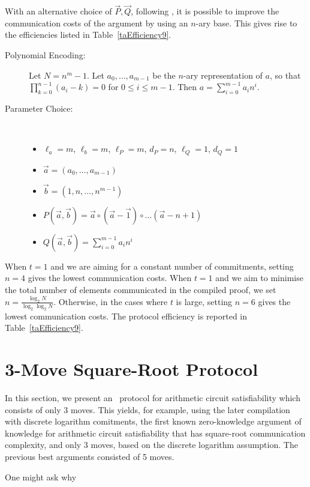 With an alternative choice of $\vec{P},\vec{Q}$, following \cite{Chaabouni2010}, it is possible to improve the communication costs of the argument by using an $n$-ary base. This gives rise to the efficiencies listed in Table~\ref{taEfficiency9}.
\begin{description}
\item[ Polynomial Encoding: ] Let $N=n^m-1$. Let $a_0,\ldots,a_{m-1}$ be the $n$-ary representation of $a$, so that $\prod_{k=0}^{n-1} (a_i - k) = 0$ for $0 \leq i \leq m-1$. Then $a = \sum_{i=0}^{m-1} a_i n^i$.
\item[ Parameter Choice: ] \ 
\begin{itemize}
\item $\ell_a=m$, $\ell_b=m$, $\ell_P=m$, $d_P=n$, $\ell_Q=1$, $d_Q=1$ 
\item $\vec{a} = (a_0,\ldots,a_{m-1})$
\item $\vec{b} = (1,n,\ldots,n^{m-1})$
\item $P(\vec{a},\vec{b}) = \vec{a} \circ ( \vec{a}-\vec{1} ) \circ \ldots ( \vec{a} - n+1 ) $
\item $Q(\vec{a},\vec{b}) = \sum_{i=0}^{m-1} a_i n^i$
\end{itemize}
\end{description}

When $t=1$ and we are aiming for a constant number of commitments, setting $n=4$ gives the lowest communication costs. When $t=1$ and we aim to minimise the total number of elements communicated in the compiled proof, we set $n = \frac{\log_2N}{\log_2 \log_2 N}$. Otherwise, in the cases where $t$ is large, setting $n=6$ gives the lowest communication costs. The protocol efficiency is reported in Table~\ref{taEfficiency9}.

\section{3-Move Square-Root Protocol} \label{subsec:3rndsqrt}

In this section, we present an \ILC\ protocol for arithmetic circuit satisfiability which consists of only 3 moves. This yields, for example, using the later compilation with discrete logarithm comitments, the first known zero-knowledge argument of knowledge for arithmetic circuit satisfiability that has square-root communication complexity, and only 3 moves, based on the discrete logarithm assumption. The previous best arguments \cite{Seo2011a,Groth2009b} consisted of 5 moves.

One might ask why 


